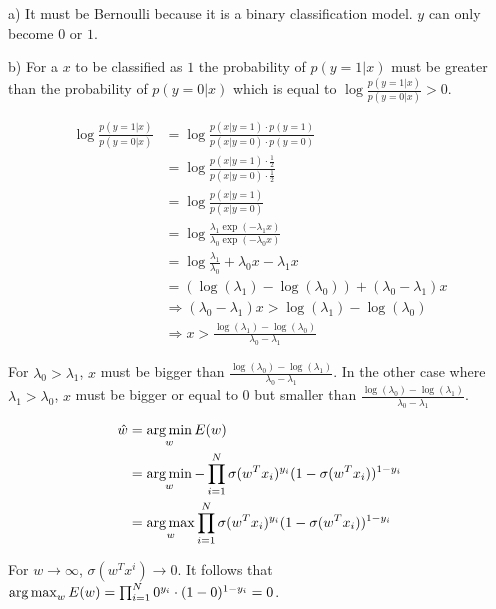 %
%
%
\begin{flushleft}
a) It must be Bernoulli because it is a binary classification model. $y$ can only become $0$ or $1$.
\end{flushleft}
\begin{flushleft}
b) For a $x$ to be classified as $1$ the probability of $p(y=1|x)$ must be greater than the probability of $p(y=0|x)$ which is equal to $\log \frac{p(y=1|x)}{p(y=0|x)} > 0$.
\end{flushleft}
\begin{align*}
  \log \frac{p(y=1|x)}{p(y=0|x)} &= \log \frac{p(x|y=1)\cdot p(y=1)}{p(x|y=0)\cdot p(y=0)} \\
  &= \log \frac{p(x|y=1)\cdot \frac{1}{2}}{p(x|y=0)\cdot \frac{1}{2}} \\
  &= \log \frac{p(x|y=1)}{p(x|y=0)} \\
  &= \log \frac{\lambda_1 \exp(-\lambda_1 x)}{\lambda_0 \exp(-\lambda_0 x)} \\
  &= \log \frac{\lambda_1}{\lambda_0} + \lambda_0 x - \lambda_1x \\
  &= (\log(\lambda_1) - \log(\lambda_0)) + (\lambda_0 - \lambda_1)x \\
  &\Rightarrow (\lambda_0 - \lambda_1)x > \log(\lambda_1) - \log(\lambda_0) \\
  &\Rightarrow x > \frac{\log(\lambda_1) - \log(\lambda_0)}{\lambda_0 - \lambda_1}
\end{align*}
\begin{flushleft}
For $\lambda_0 > \lambda_1$, $x$ must be bigger than $\frac{\log(\lambda_0) - \log(\lambda_1)}{\lambda_0 - \lambda_1}$. In the other case where $\lambda_1 > \lambda_0$, $x$ must be bigger or equal to 0 but smaller than $\frac{\log(\lambda_0) - \log(\lambda_1)}{\lambda_0 - \lambda_1}$.
\end{flushleft}
%
%
\begin{align*}
  \hat{w} &= \operatorname*{arg\,min}_w E(w) \\
  &= \operatorname*{arg\,min}_w -\prod_{i=1}^N \sigma(w^T x_i)^{y_i} (1-\sigma(w^T x_i))^{1-y_i} \\
  &= \operatorname*{arg\,max}_w \prod_{i=1}^N \sigma(w^T x_i)^{y_i} (1-\sigma(w^T x_i))^{1-y_i} \\
\end{align*}
\begin{flushleft}
For $w \longrightarrow \infty$, $\sigma(w^T x^i) \longrightarrow 0$. It follows that $\operatorname*{arg\,max}_w E(w) = \prod_{i=1}^N 0^{y_i} \cdot (1-0)^{1-y_i} = 0$.
\end{flushleft}
